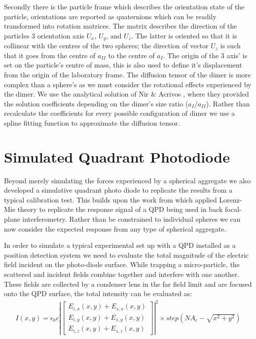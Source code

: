 Secondly there is the particle frame which describes the orientation state of 
the particle, orientations are reported as quaternions which can be readily 
transformed into rotation matrices. The matrix describes the direction of the 
particles 3 orientation axis $U_x$, $U_y$, and $U_z$. The latter is oriented 
so that it is collinear with the centres of the two spheres; the direction of
vector $U_z$ is such that it goes from the centre of $a_{II}$ to the centre of
$a_{I}$. The origin of the 3 axis' is set on the particle's centre of mass, 
this is also used to define it's displacement from the origin of the laboratory 
frame. The diffusion tensor of the dimer is more complex than a sphere's as we 
must consider the rotational effects experienced by the dimer. We use the 
analytical solution of Nir \& Acrivos \cite{Nir1973}, where they provided the 
solution coefficients depending on the dimer's size ratio ($a_I/a_{II}$). Rather 
than recalculate the coefficients for every possible configuration of dimer we 
use a spline fitting function to approximate the diffusion tensor. 
\section{Simulated Quadrant Photodiode}
\label{sec:simulated_QPD}

Beyond merely simulating the forces experienced by a spherical 
aggregate we also developed a simulative quadrant photo diode 
to replicate the results from a typical calibration test. This 
builds upon the work from \cite{Rohrbach2002} which applied 
Lorenz-Mie theory to replicate the response signal of a QPD 
being used in back focal-plane interferometry. Rather than be 
constrained to individual spheres we can now consider the 
expected response from any type of spherical aggregate. 

In order to simulate a typical experimental set up with a QPD 
installed as a position detection system we need to evaluate 
the total magnitude of the electric field incident on the 
photo-diode surface. While trapping a micro-particle, the 
scattered and incident fields combine together and interfere 
with one another. These fields are collected by a condenser 
lens in the far field limit and are focused onto the QPD 
surface, the total intensity can be evaluated as:
\begin{align}
I(x,y) = \epsilon_0c\left|
\begin{bmatrix} 
	E_{i,x}(x,y)+E_{s,x}(x,y) \\ 
	E_{i,y}(x,y)+E_{s,y}(x,y) \\ 
	E_{i,z}(x,y)+E_{s,z}(x,y)
\end{bmatrix} \right|^2 \times step(NA_c-\sqrt{x^2+y^2})
\end{align}

